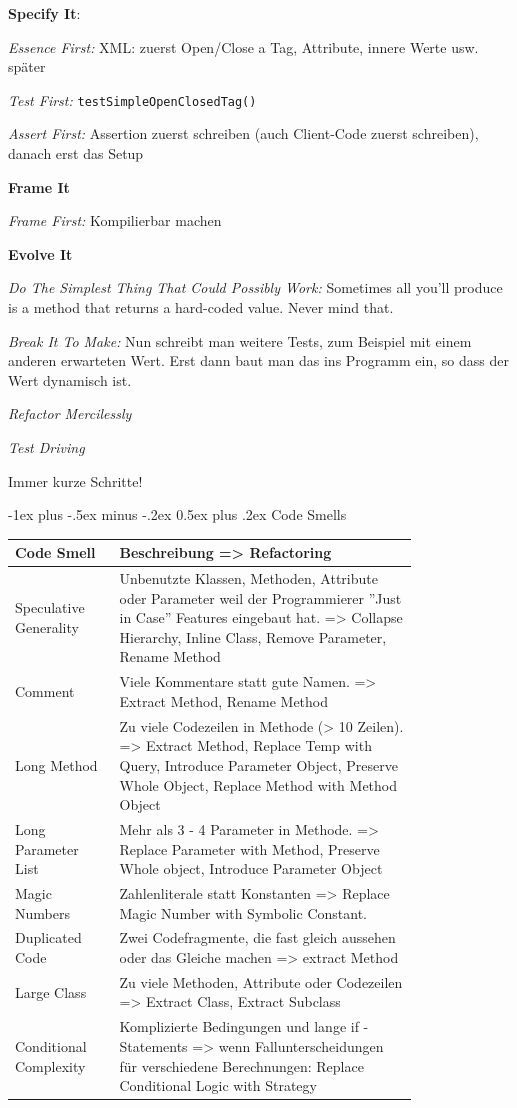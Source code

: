 \documentclass[a4paper, fontsize=6pt]{scrartcl}
\makeatletter
\renewcommand{\section}{\@startsection{section}{1}{0mm}%
    {-1ex plus -.5ex minus -.2ex}%
    {0.5ex plus .2ex}%
    {\normalfont\large\bfseries}}
\makeatother
\begin{document}
\begin{multicols*}{5}
\textbf{Specify It}:

\textit{Essence First:}
XML: zuerst Open/Close a Tag, Attribute, innere Werte usw. später

\textit{Test First:}
\texttt{testSimpleOpenClosedTag() {}}

\textit{Assert First:}
Assertion zuerst schreiben (auch Client-Code zuerst schreiben), danach erst das Setup

\textbf{Frame It}

\textit{Frame First:}
Kompilierbar machen

\textbf{Evolve It}

\textit{Do The Simplest Thing That Could Possibly Work:}
Sometimes all you'll produce is a method that returns a hard-coded value. Never mind that.

\textit{Break It To Make:}
Nun schreibt man weitere Tests, zum Beispiel mit einem anderen erwarteten Wert. Erst dann baut man das ins Programm ein, so dass der Wert dynamisch ist.

\textit{Refactor Mercilessly}

\textit{Test Driving}

Immer kurze Schritte!

\section{Code Smells}

\begin{tabular}{|p{0.2\linewidth}|p{0.6\linewidth}|}
 \hline
 Code Smell & Beschreibung => Refactoring \\ 
 \hline
 Speculative Generality & Unbenutzte Klassen, Methoden, Attribute oder Parameter weil der Programmierer ''Just in Case'' Features eingebaut hat. => Collapse Hierarchy, Inline Class, Remove Parameter, Rename Method \\ 
 \hline
 Comment & Viele Kommentare statt gute Namen. => Extract Method, Rename Method \\ 
 \hline
 Long Method & Zu viele Codezeilen in Methode (> 10 Zeilen). => Extract Method, Replace Temp with Query, Introduce Parameter Object, Preserve Whole Object, Replace Method with Method Object \\ 
 \hline
 Long Parameter List & Mehr als 3 - 4 Parameter in Methode. => Replace Parameter with Method, Preserve Whole object, Introduce Parameter Object \\ 
 \hline
 Magic Numbers & Zahlenliterale statt Konstanten => Replace Magic Number with Symbolic Constant. \\ 
 \hline
 Duplicated Code & Zwei Codefragmente, die fast gleich aussehen oder das Gleiche machen => extract Method \\ 
 \hline
 Large Class & Zu viele Methoden, Attribute oder Codezeilen => Extract Class, Extract Subclass \\
 \hline
 Conditional Complexity & Komplizierte Bedingungen und lange if -Statements =>
wenn Fallunterscheidungen für verschiedene Berechnungen: Replace Conditional Logic with Strategy


\end{tabular}
\end{multicols*}
\end{document}
